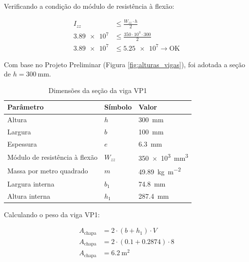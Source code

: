 Verificando a condição do módulo de resistência à flexão:

\begin{align*}
  I_{zz}       & \leq \frac{W_{zz} \cdot h}{2}           \\
  \num{3.89e7} & \leq \frac{350 \cdot 10^3 \cdot 300}{2} \\
  \num{3.89e7} & \leq \num{5.25e7} \rightarrow \text{OK}
\end{align*}

Com base no Projeto Preliminar (Figura \ref{fig:alturas_vigas}), foi adotada a seção de $h = \SI{300}{\milli\meter}$.

\begin{table}[H]
  \centering
  \caption{Dimensões da seção da viga VP1}
  \label{tab:dimensoes_vp1}
  \begin{tabularx}{\textwidth}{>{\centering\arraybackslash}X>{\centering\arraybackslash}X>{\centering\arraybackslash}X}
    \toprule
    Parâmetro                      & Símbolo  & Valor                              \\
    \midrule
    Altura                         & $h$      & \SI{300}{\milli\meter}             \\
    Largura                        & $b$      & \SI{100}{\milli\meter}             \\
    Espessura                      & $e$      & \SI{6.3}{\milli\meter}             \\
    Módulo de resistência à flexão & $W_{zz}$ & \SI{350e3}{\milli\meter\cubed}     \\
    Massa por metro quadrado       & $m$      & \SI{49.89}{\kilo\gram\per\meter^2} \\
    Largura interna                & $b_1$    & \SI{74.8}{\milli\meter}            \\
    Altura interna                 & $h_1$    & \SI{287.4}{\milli\meter}           \\
    \bottomrule
  \end{tabularx}
\end{table}

Calculando o peso da viga VP1:

\begin{align*}
  A_{\text{chapa}} & = 2 \cdot \left( b + h_1 \right) \cdot V                        \\
  A_{\text{chapa}} & = 2 \cdot \left( \num{0.1} + \num{0.2874} \right) \cdot \num{8} \\
  A_{\text{chapa}} & = \boxed{\SI{6.2}{\meter^2}}
\end{align*}

